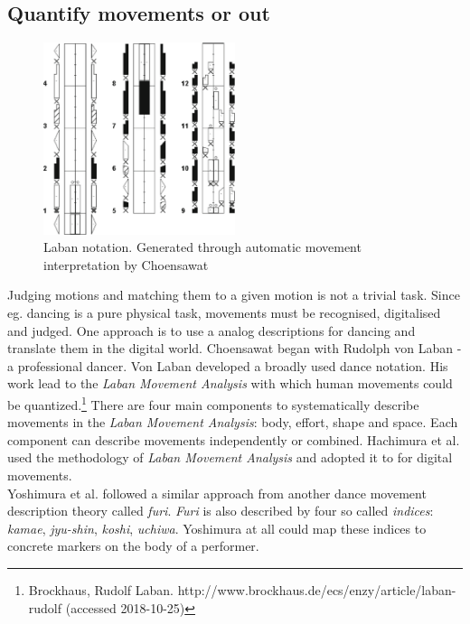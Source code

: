 
\subsection{Quantify movements \todo or out} \label{quantifymovements}
\begin{figure}
	\centering
	\includegraphics[width=0.5\textwidth]{img/laban.png}
	\caption{Laban notation. Generated through automatic movement interpretation by Choensawat \cite{Choensawat2015}}
	\label{fig:laban}
\end{figure}
Judging motions and matching them to a given motion is not a trivial task. Since eg. dancing is a pure physical task, movements must be recognised, digitalised and judged. One approach is to use a analog descriptions for dancing and translate them in the digital world. Choensawat \cite{Choensawat2015} began with Rudolph von Laban - a professional dancer. Von Laban developed a broadly used dance notation. His work lead to the \textit{Laban Movement Analysis} with which human movements could be quantized.\footnote{Brockhaus, Rudolf Laban. http://www.brockhaus.de/ecs/enzy/article/laban-rudolf (accessed 2018-10-25)} There are four main components to systematically describe movements in the \textit{Laban Movement Analysis}: body, effort, shape and space. Each component can describe movements independently or combined. Hachimura et al. \cite{Hachimura2005} used the methodology  of \textit{Laban Movement Analysis} and adopted it to for digital movements.\\
Yoshimura et al. \cite{Yoshimura2005} followed a similar approach from another dance movement description theory called \textit{furi}. \textit{Furi} is also described by four so called \textit{indices}: \textit{kamae}, \textit{jyu-shin}, \textit{koshi}, \textit{uchiwa}. Yoshimura at all could map these indices to concrete markers on the body of a performer.
